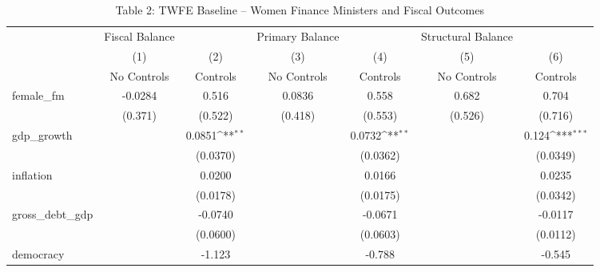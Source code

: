 \begin{table}[htbp]\centering
\def\sym#1{\ifmmode^{#1}\else\(^{#1}\)\fi}
\caption{Table 2: TWFE Baseline -- Women Finance Ministers and Fiscal Outcomes}
\begin{adjustbox}{max width=\textwidth}
\small
\begin{tabular}{l*{6}{c}}
\hline\hline
            &Fiscal Balance         &                     &Primary Balance         &                     &Structural Balance         &                     \\
            &\multicolumn{1}{c}{(1)}&\multicolumn{1}{c}{(2)}&\multicolumn{1}{c}{(3)}&\multicolumn{1}{c}{(4)}&\multicolumn{1}{c}{(5)}&\multicolumn{1}{c}{(6)}\\
            &\multicolumn{1}{c}{No Controls}&\multicolumn{1}{c}{Controls}&\multicolumn{1}{c}{No Controls}&\multicolumn{1}{c}{Controls}&\multicolumn{1}{c}{No Controls}&\multicolumn{1}{c}{Controls}\\
\hline
female\_fm   &     -0.0284         &       0.516         &      0.0836         &       0.558         &       0.682         &       0.704         \\
            &     (0.371)         &     (0.522)         &     (0.418)         &     (0.553)         &     (0.526)         &     (0.716)         \\
[1em]
gdp\_growth  &                     &      0.0851\sym{**} &                     &      0.0732\sym{**} &                     &       0.124\sym{***}\\
            &                     &    (0.0370)         &                     &    (0.0362)         &                     &    (0.0349)         \\
[1em]
inflation   &                     &      0.0200         &                     &      0.0166         &                     &      0.0235         \\
            &                     &    (0.0178)         &                     &    (0.0175)         &                     &    (0.0342)         \\
[1em]
gross\_debt\_gdp&                     &     -0.0740         &                     &     -0.0671         &                     &     -0.0117         \\
            &                     &    (0.0600)         &                     &    (0.0603)         &                     &    (0.0112)         \\
[1em]
democracy   &                     &      -1.123         &                     &      -0.788         &                     &      -0.545         \\

\end{tabular}
\end{adjustbox}
\end{table}
